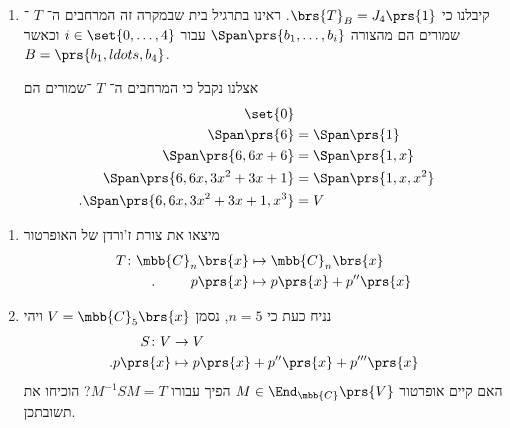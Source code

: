\documentclass[a4paper,10pt,twoside,openany]{book}
\begin{document}
\begin{solution}
\begin{enumerate}
\item
קיבלנו כי
$\brs{T}_B = J_4\prs{1}$.
ראינו בתרגיל בית שבמקרה זה המרחבים ה־%
$T$%
־שמורים הם מהצורה
$\Span\prs{b_1, \ldots, b_i}$
עבור
$i \in \set{0, \ldots, 4}$
וכאשר
$B = \prs{b_1, ldots, b_4}$.

אצלנו נקבל כי המרחבים ה־%
$T$%
־שמורים הם
\begin{align*}
\set{0} \\
\Span\prs{6} &= \Span\prs{1} \\
\Span\prs{6, 6x + 6} &= \Span\prs{1, x} \\
\Span\prs{6, 6x, 3 x^2 + 3x + 1} &= \Span\prs{1,x, x^2} \\
\text{.} \Span\prs{6,6x, 3x^2 + 3x + 1, x^3} &= V
\end{align*}
\end{enumerate}
\end{solution}

\begin{exercisechap}
\begin{enumerate}
\item מיצאו את צורת ז'ורדן של האופרטור
\begin{align*}
T \colon \mbb{C}_n\brs{x} &\mapsto \mbb{C}_n\brs{x} \\
\text{.} \hphantom{lalala} p\prs{x} &\mapsto p\prs{x} + p''\prs{x}
\end{align*}

\item
נניח כעת כי
$n = 5$,
נסמן
$V = \mbb{C}_5\brs{x}$
ויהי
\begin{align*}
S \colon V &\to V \\
\text{.} p\prs{x} &\mapsto p\prs{x} + p''\prs{x} + p'''\prs{x}
\end{align*}
האם קיים אופרטור
$M \in \End_{\mbb{C}}\prs{V}$
הפיך עבורו
$M^{-1} S M = T$?
הוכיחו את תשובתכן.
\end{enumerate}
\end{exercisechap}
\end{document}
